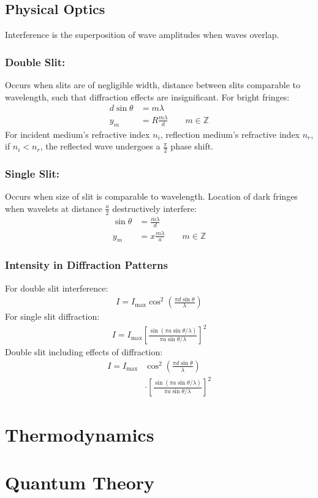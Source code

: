 \documentclass[11pt]{article}
\begin{document}
\begin{multicols*}{3}
\subsection{Physical Optics}
Interference is the superposition of wave amplitudes when waves overlap.
\subsubsection{Double Slit:}
Occurs when slits are of negligible width, distance between slits comparable to wavelength, such that diffraction effects are insignificant. For bright fringes:
	\begin{align*}
	d\sin{\theta}&=m\lambda \\
	y_m&=R\frac{m\lambda}{d} \qquad m \in \mathbb{Z}
	\end{align*}
For incident medium's refractive index $n_i$, reflection medium's refractive index $n_r$, if $n_i < n_r$, the reflected wave undergoes a $\frac{\pi}{2}$ phase shift.
\subsubsection{Single Slit:}
Occurs when size of slit is comparable to wavelength. Location of dark fringes when wavelets at distance $\frac{a}{2}$ destructively interfere:
	\begin{align*}
	\sin{\theta}&=\frac{m\lambda}{d} \\
	y_m&=x\frac{m\lambda}{a} \qquad m \in \mathbb{Z}
	\end{align*}
\subsubsection{Intensity in Diffraction Patterns}
For double slit interference:
	\begin{align*}
	I = I_{\text{max}} \cos^2\left(\frac{\pi d \sin{\theta}}{\lambda} \right)
	\end{align*}
For single slit diffraction:
	\begin{align*}
	I = I_{\text{max}} \left [\frac{\sin(\pi a \sin \theta / \lambda)}{\pi a \sin \theta / \lambda} \right]^2
	\end{align*}
Double slit including effects of diffraction:
	\begin{align*}
	I = I_{\text{max}} &\cos^2\left(\frac{\pi d \sin{\theta}}{\lambda} \right) \\
	&\cdot  \left [\frac{\sin(\pi a \sin \theta / \lambda)}{\pi a \sin \theta / \lambda} \right]^2
	\end{align*}
	
\section{Thermodynamics}

\section{Quantum Theory}

\end{multicols*}
\end{document}
